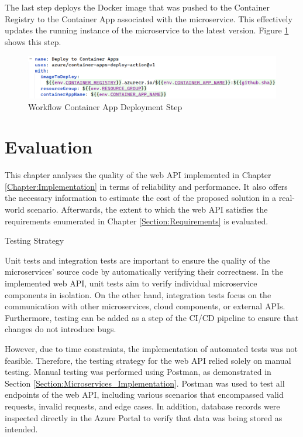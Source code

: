 \documentclass[12pt, reqno]{amsbook}
\makeatletter
\def\section{\@startsection{section}{1}%
      \z@{.5\linespacing\@plus.7\linespacing}{.25\linespacing}%
      {\normalfont\bfseries\flushleft}}
\theoremstyle{definition}
\theoremstyle{definition}
\numberwithin{section}{chapter}
\numberwithin{table}{chapter}
\numberwithin{figure}{chapter}
\makeatother
\begin{document}
The last step deploys the Docker image that was pushed to the Container Registry to the Container App associated with the microservice. This effectively updates the running instance of the microservice to the latest version. Figure \ref{Figure:GithubWorkflowContainerAppDeployment} shows this step.

\begin{figure}[H]
  \centering
  \includegraphics[width=1\linewidth]{images/GithubWorkflowContainerAppDeployment.png}
  \caption{\label{Figure:GithubWorkflowContainerAppDeployment}Workflow Container App Deployment Step}
\end{figure}

\chapter{Evaluation}
\label{Chapter:Evaluation}

This chapter analyses the quality of the web \ac{API} implemented in Chapter \ref{Chapter:Implementation} in terms of reliability and performance. It also offers the necessary information to estimate the cost of the proposed solution in a real-world scenario. Afterwards, the extent to which the web \ac{API} satisfies the requirements enumerated in Chapter \ref{Section:Requirements} is evaluated.

\section{Testing Strategy}
\label{Section:Testing_Strategy}

Unit tests and integration tests are important to ensure the quality of the microservices' source code by automatically verifying their correctness. In the implemented web \ac{API}, unit tests aim to verify individual microservice components in isolation. On the other hand, integration tests focus on the communication with other microservices, cloud components, or external \acp{API}. Furthermore, testing can be added as a step of the CI/CD pipeline to ensure that changes do not introduce bugs.

However, due to time constraints, the implementation of automated tests was not feasible. Therefore, the testing strategy for the web \ac{API} relied solely on manual testing. Manual testing was performed using Postman, as demonstrated in Section \ref{Section:Microservices_Implementation}. Postman was used to test all endpoints of the web \ac{API}, including various scenarios that encompassed valid requests, invalid requests, and edge cases. In addition, database records were inspected directly in the Azure Portal to verify that data was being stored as intended.
\end{document}
